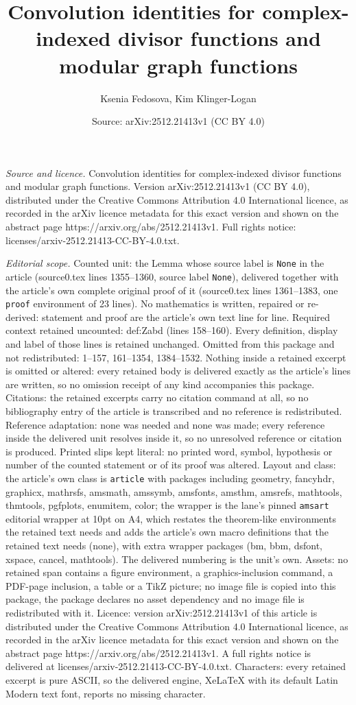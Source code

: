 \documentclass[10pt,a4paper]{amsart}
\title[Convolution identities for complex-indexed divisor functions]{Convolution identities for complex-indexed divisor functions and modular graph functions}
\author{Ksenia Fedosova, Kim Klinger-Logan}
\date{Source: arXiv:2512.21413v1 (CC BY 4.0)}
\begin{document}
\maketitle

\noindent\emph{Source and licence.} Convolution identities for complex-indexed divisor functions and modular graph functions. Version arXiv:2512.21413v1 (CC BY 4.0), distributed under the Creative Commons Attribution 4.0 International licence, as recorded in the arXiv licence metadata for this exact version and shown on the abstract page https://arxiv.org/abs/2512.21413v1. Full rights notice: licenses/arxiv-2512.21413-CC-BY-4.0.txt.\par\smallskip

\noindent\textit{Editorial scope.} Counted unit: the Lemma whose source label is \texttt{None} in the article (source0.tex lines 1355--1360, source label \texttt{None}), delivered together with the article's own complete original proof of it (source0.tex lines 1361--1383, one \texttt{proof} environment of 23 lines). No mathematics is written, repaired or re-derived: statement and proof are the article's own text line for line. Required context retained uncounted: def:Zabd (lines 158--160). Every definition, display and label of those lines is retained unchanged. Omitted from this package and not redistributed: 1--157, 161--1354, 1384--1532. Nothing inside a retained excerpt is omitted or altered: every retained body is delivered exactly as the article's lines are written, so no omission receipt of any kind accompanies this package. Citations: the retained excerpts carry no citation command at all, so no bibliography entry of the article is transcribed and no reference is redistributed. Reference adaptation: none was needed and none was made; every reference inside the delivered unit resolves inside it, so no unresolved reference or citation is produced. Printed slips kept literal: no printed word, symbol, hypothesis or number of the counted statement or of its proof was altered. Layout and class: the article's own class is \texttt{article} with packages including geometry, fancyhdr, graphicx, mathrsfs, amsmath, amssymb, amsfonts, amsthm, amsrefs, mathtools, thmtools, pgfplots, enumitem, color; the wrapper is the lane's pinned \texttt{amsart} editorial wrapper at 10pt on A4, which restates the theorem-like environments the retained text needs and adds the article's own macro definitions that the retained text needs (none), with extra wrapper packages (bm, bbm, dsfont, xspace, cancel, mathtools). The delivered numbering is the unit's own. Assets: no retained span contains a figure environment, a graphics-inclusion command, a PDF-page inclusion, a table or a TikZ picture; no image file is copied into this package, the package declares no asset dependency and no image file is redistributed with it. Licence: version arXiv:2512.21413v1 of this article is distributed under the Creative Commons Attribution 4.0 International licence, as recorded in the arXiv licence metadata for this exact version and shown on the abstract page https://arxiv.org/abs/2512.21413v1. A full rights notice is delivered at licenses/arxiv-2512.21413-CC-BY-4.0.txt. Characters: every retained excerpt is pure ASCII, so the delivered engine, XeLaTeX with its default Latin Modern text font, reports no missing character.
\end{document}

